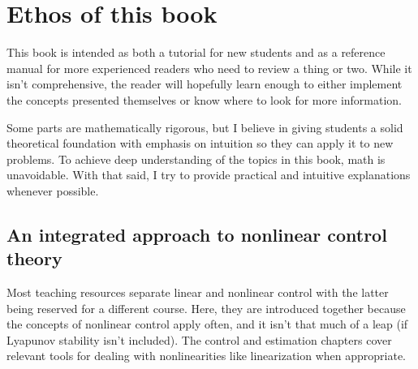 \section{Ethos of this book}

This book is intended as both a tutorial for new students and as a reference
manual for more experienced readers who need to review a thing or two. While it
isn't comprehensive, the reader will hopefully learn enough to either implement
the concepts presented themselves or know where to look for more information.

Some parts are mathematically rigorous, but I believe in giving students a solid
theoretical foundation with emphasis on intuition so they can apply it to new
problems. To achieve deep understanding of the topics in this book, math is
unavoidable. With that said, I try to provide practical and intuitive
explanations whenever possible.

\subsection{An integrated approach to nonlinear control theory}

Most teaching resources separate linear and nonlinear control with the latter
being reserved for a different course. Here, they are introduced together
because the concepts of nonlinear control apply often, and it isn't that much of
a leap (if Lyapunov stability isn't included). The control and estimation
chapters cover relevant tools for dealing with nonlinearities like linearization
when appropriate.
